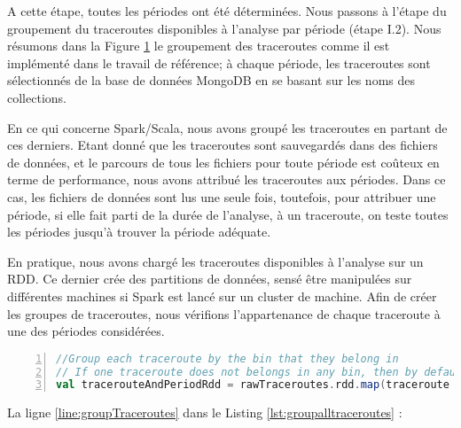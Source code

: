 A cette étape, toutes les périodes ont été déterminées. Nous passons à l'étape du groupement du traceroutes disponibles à l'analyse par période (étape I.2). Nous résumons dans la Figure \ref{fig:read-data-from-mongodb} le groupement des traceroutes comme il est implémenté dans le travail de référence; à chaque période, les traceroutes sont sélectionnés de la base de données MongoDB en se basant sur les noms des collections. 
\begin{figure}[h]
	\centering
	
	\captionsetup{justification=centering}
	\resizebox{\textwidth}{!}{
	
}
	\caption{}

	\label{fig:read-data-from-mongodb}

\end{figure}


En ce qui concerne Spark/Scala, nous avons groupé les traceroutes en partant de ces derniers. Etant donné que les traceroutes sont sauvegardés dans des fichiers de données, et le parcours de tous les fichiers pour toute  période est coûteux en terme de performance, nous avons attribué les traceroutes aux périodes. Dans ce cas, les fichiers de données sont lus une seule fois, toutefois, pour attribuer une période, si elle fait parti de la durée de l'analyse,  à un traceroute, on teste toutes les périodes jusqu'à trouver la période adéquate.

En pratique, nous avons chargé les traceroutes disponibles à l'analyse sur un RDD. Ce dernier crée des partitions de données, sensé être manipulées sur différentes machines si Spark est lancé sur un cluster de machine. Afin de créer les groupes de traceroutes, nous vérifions l'appartenance de chaque traceroute à une des périodes considérées.

\begin{lstlisting}[language=scala,firstnumber=1, caption={},label={lst:groupalltraceroutes}, basicstyle = \small,escapechar=|,numbers=left,
stepnumber=1]
//Group each traceroute by the bin that they belong in 
// If one traceroute does not belongs in any bin, then by default it belongs to the bin 0
val tracerouteAndPeriodRdd = rawTraceroutes.rdd.map(traceroute => TracerouteWithTimewindow(traceroute, findTimeWindowOfTraceroute(traceroute, rangeDatesTimewindows)))|\label{line:groupTraceroutes}|
\end{lstlisting}

La ligne \ref{line:groupTraceroutes} dans le Listing \ref{lst:groupalltraceroutes} :

